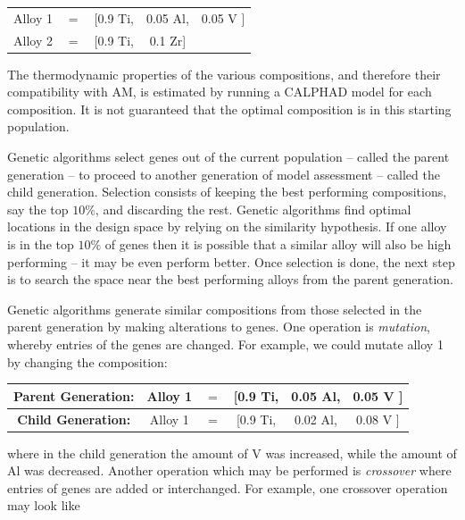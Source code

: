 \begin{table}[h!]
\begin{center}
\begin{tabular}{ccccc}
	Alloy 1 & $=$ & [0.9 Ti, & 0.05 Al, & 0.05 V ] \\
	Alloy 2 & $=$ & [0.9 Ti, & 0.1 Zr] & \\
\end{tabular}
\end{center}
\end{table}
\noindent
The thermodynamic properties of the various compositions, and therefore their compatibility with AM, is estimated by running a CALPHAD model for each composition. It is not guaranteed that the optimal composition is in this starting population.

Genetic algorithms select genes out of the current population -- called the parent generation --  to proceed to another generation of model assessment -- called the child generation. Selection consists of keeping the best performing compositions, say the top $10\%$, and discarding the rest. Genetic algorithms find optimal locations in the design space by relying on the similarity hypothesis. If one alloy is in the top $10\%$ of genes then it is possible that a similar alloy will also be high performing -- it may be even perform better. Once selection is done, the next step is to search the space near the best performing alloys from the parent generation.

Genetic algorithms generate similar compositions from those selected in the parent generation by making alterations to genes. One operation is \textit{mutation}, whereby entries of the genes are changed. For example, we could mutate alloy 1 by changing the composition:

\begin{table}[h!]
\begin{center}
\begin{tabular}{c|ccccc}
	\textbf{Parent Generation:} & Alloy 1 & $=$ & [0.9 Ti, & {\color{red}0.05} Al, & {\color{red}0.05} V ] \\ \hline
	\textbf{Child Generation:} & Alloy 1 & $=$ & [0.9 Ti, & {\color{green}0.02} Al, & {\color{green}0.08} V  ]  \\ 
\end{tabular}
\end{center}
\end{table}
\noindent where in the child generation the amount of V was increased, while the amount of Al was decreased. Another operation which may be performed is \textit{crossover} where entries of genes are added or interchanged. For example, one crossover operation may look like

